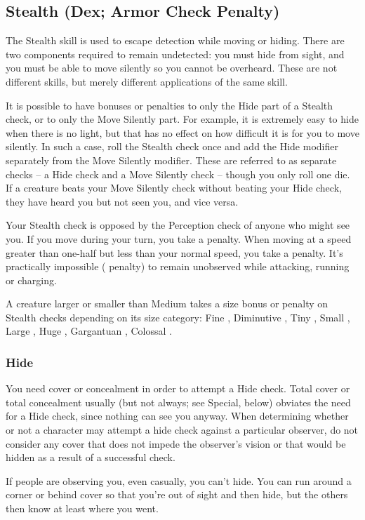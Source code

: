 \subsection{Stealth (Dex; Armor Check Penalty)}
The Stealth skill is used to escape detection while moving or hiding. There are two components required to remain undetected: you must hide from sight, and you must be able to move silently so you cannot be overheard. These are not different skills, but merely different applications of the same skill.

It is possible to have bonuses or penalties to only the Hide part of a Stealth check, or to only the Move Silently part. For example, it is extremely easy to hide when there is no light, but that has no effect on how difficult it is for you to move silently. In such a case, roll the Stealth check once and add the Hide modifier separately from the Move Silently modifier. These are referred to as separate checks -- a Hide check and a Move Silently check -- though you only roll one die. If a creature beats your Move Silently check without beating your Hide check, they have heard you but not seen you, and vice versa.

 Your Stealth check is opposed by the Perception check of anyone who might see you. If you move during your turn, you take a  penalty. When moving at a speed greater than one-half but less than your normal speed, you take a  penalty. It's practically impossible ( penalty) to remain unobserved while attacking, running or charging.

A creature larger or smaller than Medium takes a size bonus or penalty on Stealth checks depending on its size category: Fine , Diminutive , Tiny , Small , Large , Huge , Gargantuan , Colossal .

\subsubsection{Hide}
You need cover or concealment in order to attempt a Hide check. Total cover or total concealment usually (but not always; see Special, below) obviates the need for a Hide check, since nothing can see you anyway. When determining whether or not a character may attempt a hide check against a particular observer, do not consider any cover that does not impede the observer's vision or that would be hidden as a result of a successful check.

If people are observing you, even casually, you can't hide. You can run around a corner or behind cover so that you're out of sight and then hide, but the others then know at least where you went.

